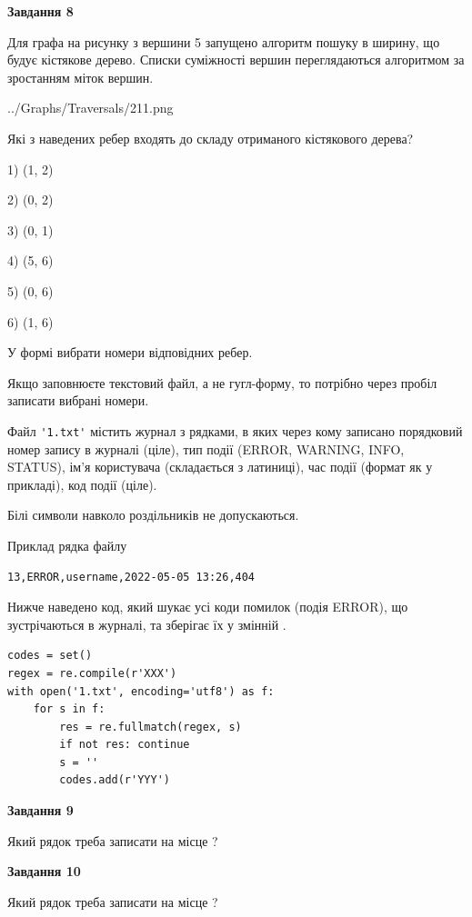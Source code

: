 \documentclass[12pt, ukrainian]{article}
\def\code#1{\Verb!#1!}
\begin{document}
{\begin {large}
{\begin {center}\textbf{Завдання 8}\end {center}}\par
Для графа на рисунку з вершини 5 запущено алгоритм пошуку в ширину, що будує кістякове дерево. Списки суміжності вершин переглядаються алгоритмом за зростанням міток вершин.\par
\begin{center}
	{../Graphs/Traversals/211.png}
\end{center}
\par Які з наведених ребер входять до складу отриманого кістякового дерева?\par
1) (1, 2)\par
2) (0, 2)\par
3) (0, 1)\par
4) (5, 6)\par
5) (0, 6)\par
6) (1, 6)\par
{\vskip 15pt} У формі вибрати номери відповідних ребер.


Якщо заповнюєте текстовий файл, а не гугл-форму, то потрібно через пробіл записа\-ти вибрані номери.\par
\newpage


Файл \code{'1.txt'} містить журнал з рядками, в яких через кому записано поряд\-ко\-вий номер запису в журналі (ціле), тип події (ERROR, WARNING, INFO, STATUS), ім'я користувача (складається з латиниці), час події (фор\-мат як у прикладі), код події (ціле).

Білі символи навколо роздільників не допускаються.

Приклад рядка файлу



\begin{verbatim}
13,ERROR,username,2022-05-05 13:26,404
\end{verbatim}


Нижче наведено код, який шукає усі коди помилок (подія ERROR), що зустріча\-ють\-ся в журналі, та зберігає їх у змінній .



\begin{verbatim}
codes = set()
regex = re.compile(r'XXX')
with open('1.txt', encoding='utf8') as f:
    for s in f:
        res = re.fullmatch(regex, s)
        if not res: continue
        s = ''
        codes.add(r'YYY')
\end{verbatim}


{\begin {center}\textbf{Завдання 9}\end {center}}\par
Який рядок треба записати на місце  ?\par
\vspace{5mm}


{\begin {center}\textbf{Завдання 10}\end {center}}\par
Який рядок треба записати на місце  ?\par


\newpage


\end {large}}
\end{document}
